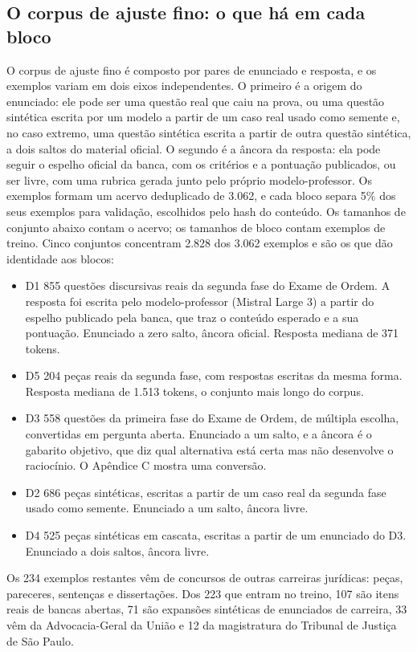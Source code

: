 \documentclass{IOS-Book-Article}
\begin{document}
\subsection{O corpus de ajuste fino: o que há em cada bloco}
O corpus de ajuste fino é composto por pares de enunciado e resposta, e os exemplos variam em dois eixos independentes. O primeiro é a origem do enunciado: ele pode ser uma questão real que caiu na prova, ou uma questão sintética escrita por um modelo a partir de um caso real usado como semente e, no caso extremo, uma questão sintética escrita a partir de outra questão sintética, a dois saltos do material oficial. O segundo é a âncora da resposta: ela pode seguir o espelho oficial da banca, com os critérios e a pontuação publicados, ou ser livre, com uma rubrica gerada junto pelo próprio modelo-professor.
Os exemplos formam um acervo deduplicado de 3.062, e cada bloco separa 5\% dos seus exemplos para validação, escolhidos pelo hash do conteúdo. Os tamanhos de conjunto abaixo contam o acervo; os tamanhos de bloco contam exemplos de treino. Cinco conjuntos concentram 2.828 dos 3.062 exemplos e são os que dão identidade aos blocos:
\begin{itemize}
\item D1 \textperiodcentered{} 855 questões discursivas reais da segunda fase do Exame de Ordem. A resposta foi escrita pelo modelo-professor (Mistral Large 3) a partir do espelho publicado pela banca, que traz o conteúdo esperado e a sua pontuação. Enunciado a zero salto, âncora oficial. Resposta mediana de 371 tokens.
\item D5 \textperiodcentered{} 204 peças reais da segunda fase, com respostas escritas da mesma forma. Resposta mediana de 1.513 tokens, o conjunto mais longo do corpus.
\item D3 \textperiodcentered{} 558 questões da primeira fase do Exame de Ordem, de múltipla escolha, convertidas em pergunta aberta. Enunciado a um salto, e a âncora é o gabarito objetivo, que diz qual alternativa está certa mas não desenvolve o raciocínio. O Apêndice C mostra uma conversão.
\item D2 \textperiodcentered{} 686 peças sintéticas, escritas a partir de um caso real da segunda fase usado como semente. Enunciado a um salto, âncora livre.
\item D4 \textperiodcentered{} 525 peças sintéticas em cascata, escritas a partir de um enunciado do D3. Enunciado a dois saltos, âncora livre.
\end{itemize}
Os 234 exemplos restantes vêm de concursos de outras carreiras jurídicas: peças, pareceres, sentenças e dissertações. Dos 223 que entram no treino, 107 são itens reais de bancas abertas, 71 são expansões sintéticas de enunciados de carreira, 33 vêm da Advocacia-Geral da União e 12 da magistratura do Tribunal de Justiça de São Paulo.
\end{document}
